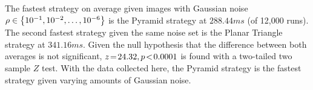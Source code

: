 %
%
%
%
The fastest strategy on average given images with Gaussian noise $\rho \in \left\{ 10^{-1}, 10^{-2}, \ldots, 10^{-6} \right\}$
is the Pyramid strategy at
$288.44\si{ms}$ (of 12,000 runs).
The second fastest strategy given the same noise set is the Planar Triangle strategy at $341.16\si{ms}$.
Given the null hypothesis that the difference between both averages is not significant, $z \!=\! 24.32, p\!<\!0.0001$ is
found with a two-tailed two sample $Z$ test.
With the data collected here, the Pyramid strategy is the fastest strategy given varying amounts of Gaussian noise.

\begin{figure*}
\end{figure*}

